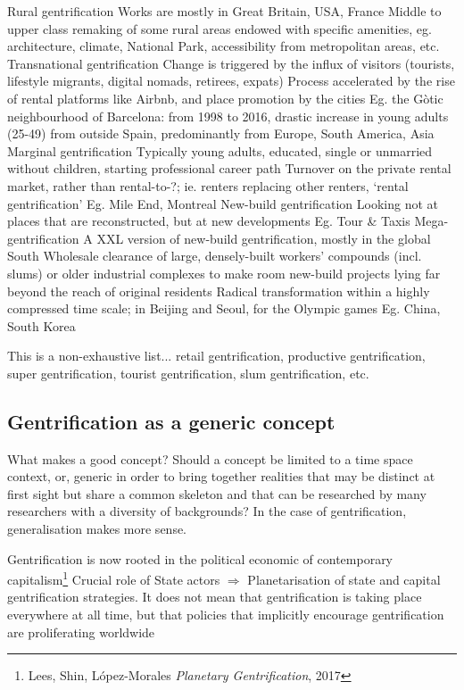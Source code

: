 \documentclass{article}
\begin{document}
\begin{outline}
	\1 Rural gentrification
		\2 Works are mostly in Great Britain, USA, France
		\2 Middle to upper class remaking of some rural areas endowed with specific amenities, eg. architecture, climate, National Park, accessibility from metropolitan areas, etc.
	\1 Transnational gentrification
		\2 Change is triggered by the influx of visitors (tourists, lifestyle migrants, digital nomads, retirees, expats)
		\2 Process accelerated by the rise of rental platforms like Airbnb, and place promotion by the cities
		\2 Eg. the Gòtic neighbourhood of Barcelona: from 1998 to 2016, drastic increase in young adults (25-49) from outside Spain, predominantly from Europe, South America, Asia
	\1 Marginal gentrification
		\2 Typically young adults, educated, single or unmarried without children, starting professional career path
		\2 Turnover on the private rental market, rather than rental-to-?; ie. renters replacing other renters, `rental gentrification'
		\2 Eg. Mile End, Montreal
	\1 New-build gentrification
		\2 Looking not at places that are reconstructed, but at new developments
		\2 Eg. Tour \& Taxis
	\1 Mega-gentrification
		\2 A XXL version of new-build gentrification, mostly in the global South
		\2 Wholesale clearance of large, densely-built workers' compounds (incl. slums) or older industrial complexes to make room new-build projects lying far beyond the reach of original residents
		\2 Radical transformation within a highly compressed time scale; in Beijing and Seoul, for the Olympic games
		\2 Eg. China, South Korea
\end{outline}

This is a non-exhaustive list... retail gentrification, productive gentrification, super gentrification, tourist gentrification, slum gentrification, etc.

\subsection{Gentrification as a generic concept}

What makes a good concept? Should a concept be limited to a time space context, or, generic in order to bring together realities that may be distinct at first sight but share a common skeleton and that can be researched by many researchers with a diversity of backgrounds? In the case of gentrification, generalisation makes more sense.

\begin{outline}
	\1 Gentrification is now rooted in the political economic of contemporary capitalism\footnote{Lees, Shin, López-Morales \textit{Planetary Gentrification}, 2017}
	\1 Crucial role of State actors
	\1 $\Rightarrow$ Planetarisation of state and capital gentrification strategies. It does not mean that gentrification is taking place everywhere at all time, but that policies that implicitly encourage gentrification are proliferating worldwide
\end{outline}
\end{document}
